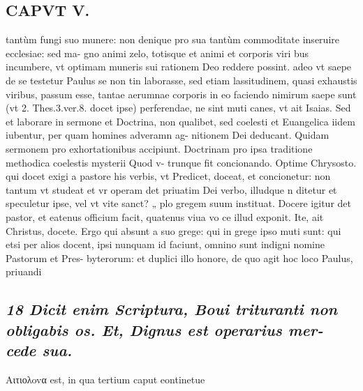 \documentclass{article}
\begin{document}
\begin{pages}
\section*{CAPVT  V. }
\marginpar{[ p.309 ]}\pstart tantùm fungi suo munere: non denique pro sua tantùm commoditate inseruire ecclesiae: sed ma- gno animi zelo, totisque et animi et corporis viri bus incumbere, vt optimam muneris sui rationem Deo reddere possint. adeo vt saepe de se testetur Paulus se non tin laborasse, sed etiam lassitudinem, quasi exhaustis viribus, passum esse, tantae aerumnae corporis in eo faciendo nimirum saepe sunt (vt 2. Thes.3.ver.8. docet ipse) perferendae, ne sint muti canes, vt ait Isaias. Sed et laborare in sermone et Doctrina, non qualibet, sed coelesti et Euangelica iidem iubentur, per quam homines adveramn ag- nitionem Dei deducant. Quidam sermonem pro exhortationibus accipiunt. Doctrinam pro ipsa traditione methodica coelestis mysterii Quod v- trunque fit concionando. Optime Chrysosto. qui docet exigi a pastore his verbis, vt Predicet, doceat, et concionetur: non tantum vt studeat et vr operam det priuatim Dei verbo, illudque n ditetur et speculetur ipse, vel vt vite sanct? „ plo gregem suum instituat. Docere igitur det pastor, et eatenus officium facit, quatenus viua vo ce illud exponit. Ite, ait Christus, docete. Ergo qui absunt a suo grege: qui in grege ipso muti sunt: qui etsi per alios docent, ipsi nunquam id faciunt, omnino sunt indigni nomine Pastorum et Pres- byterorum: et duplici illo honore, de quo agit hoc loco Paulus, priuandi  \pend
{}
{}
\subsection*{\textit{18 Dicit enim Scriptura, Boui trituranti non obligabis os. Et, Dignus est operarius mer- cede sua. }}\pstart Αιτιολovα est, in qua tertium caput eontinetue  \pend

\end{pages}
\end{document}
